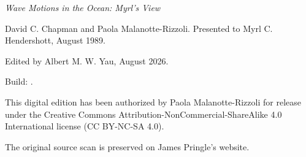 \thispagestyle{empty}
\vspace*{2.25in}
{\footnotesize
	\noindent\textit{Wave Motions in the Ocean: Myrl's View}\par
	\noindent David C. Chapman and Paola Malanotte-Rizzoli. Presented to
	Myrl C. Hendershott, August 1989.\par
	\medskip
	\noindent Edited by Albert M. W. Yau, August 2026.\par
	\medskip
	\noindent\waveprereleaseedition\par
	\smallskip
	\noindent Build:
	\href{\wavebuildurl}{\texttt{\wavebuildlabel}}.\par
	\medskip
	\noindent This digital edition has been authorized by Paola Malanotte-Rizzoli
	for release under the Creative Commons Attribution-NonCommercial-ShareAlike
	4.0 International license (CC BY-NC-SA 4.0).\par
	\medskip
	\noindent The original source scan is preserved on James Pringle's website.\par
}
\wavecovercredit
\clearpage

\WaveModernOriginalTableOfContents
\clearpage

\RenewDocumentCommand{\tableofcontents}{}{}
